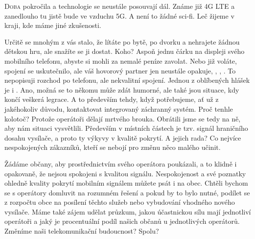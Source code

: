 \documentclass[11pt]{article}
\begin{document}
\begin{multicols}{2}{

\lettrine{D}{oba} pokročila a technologie se neustále posouvají dál. Známe již 4G LTE  a zanedlouho tu jistě bude ve vzduchu 5G. A není to žádné sci-fi. Leč žijeme v kraji, kde máme jiné zkušenosti.

Určitě se mnohým z vás stalo, že lítáte po bytě, po dvorku a nehrajete žádnou dětskou hru, ale snažíte se ji dostat. Koho? Aspoň jednu čárku na displeji svého mobilního telefonu, abyste si mohli za nemalé peníze zavolat. Nebo již voláte, spojení se uskutečnilo, ale váš hovorový partner jen neustále opakuje, , , . To nepopisuji rozchod po telefonu, ale nekvalitní spojení. Jednou z oblíbených hlášek je i . Ano, možná se to někomu může zdát humorné, ale také jsou situace, kdy končí veškerá legrace. A to především tehdy, když potřebujeme, ať už z jakéhokoliv důvodu, kontaktovat integrovaný záchranný systém. Proč tenhle kolotoč? Protože operátoři dělají mrtvého brouka. Obrátili jsme se tedy na ně, aby nám situaci vysvětlili. Především v místních částech je tzv. signál hraničního dosahu vysílače, a proto ty výkyvy v kvalitě pokrytí. A jejich rada? Co nejvíce nespokojených zákazníků, kteří se nebojí pro změnu něco malého učinit. 

Žádáme občany, aby prostřednictvím svého operátora poukázali, a to klidně i opakovaně, že nejsou spokojeni s kvalitou signálu. Nespokojenost a své poznatky ohledně kvality pokrytí mobilním signálem můžete psát i na obec. Chtěli bychom se s operátory domluvit na rozumném řešení a pokud by to bylo nutné, podílet se z rozpočtu obce na posílení těchto služeb nebo vybudování vhodného nového vysílače. Máme také zájem udělat průzkum, jakou účastnickou sílu mají jednotliví operátoři a jaký je procentuální podíl našich občanů u jednotlivých operátorů. Změníme naši telekomunikační budoucnost? Spolu?
}\end{multicols}
\closearticle
\end{document}
